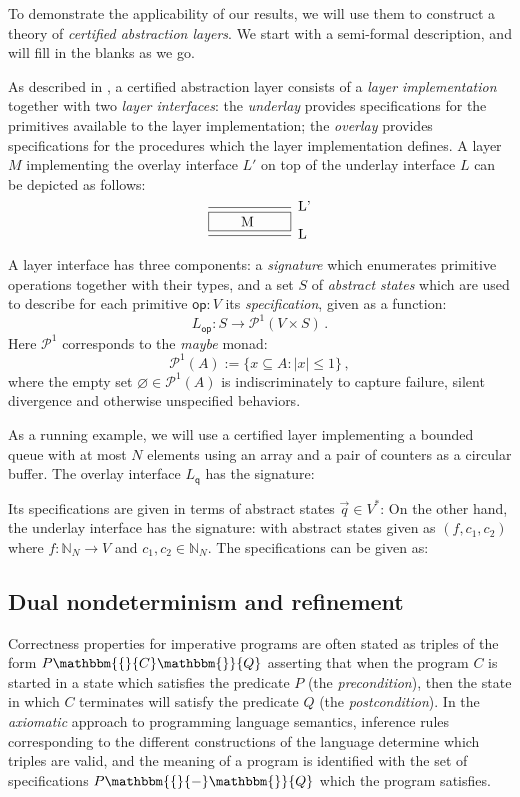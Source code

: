 \documentclass[format=sigplan,authordraft]{acmart}
\newcommand{\kw}[1]{\ensuremath{ \mathsf{#1} }}
\newcommand{\htr}[3]{{ {#1} \mathbbm{\{} {#2} \mathbbm{\}} {#3} }}
\begin{document}
To demonstrate the applicability of our results,
we will use them to construct a theory of
\emph{certified abstraction layers}.
We start with a semi-formal description,
and will fill in the blanks as we go.

As described in \cite{popl15},
a certified abstraction layer
consists of a \emph{layer implementation} together with
two \emph{layer interfaces}:
the \emph{underlay} provides specifications for
the primitives available to the layer implementation;
the \emph{overlay} provides specifications for
the procedures which the layer implementation defines.
A layer $M$ implementing the overlay interface $L'$
on top of the underlay interface $L$ can be depicted as follows:
\[
  \begin{prooftree}
    \infer0[L']{\fbox{\qquad M \qquad}}
    \infer1[L]{}
  \end{prooftree}
\]

A layer interface has three components:
a \emph{signature} which enumerates
primitive operations together with their types, and
a set $S$ of \emph{abstract states}
which are used to describe for each primitive
$\kw{op} : V$
its \emph{specification},
given as a function:
\[
  L_\kw{op} : S \rightarrow \mathcal{P}^1(V \times S) \,.
\]
Here $\mathcal{P}^1$ corresponds to the \emph{maybe} monad:
\[
  \mathcal{P}^1(A) := \{ x \subseteq A : |x| \le 1 \} \,,
\]
where the empty set $\varnothing \in \mathcal{P}^1(A)$
is indiscriminately to capture
failure, silent divergence and otherwise unspecified behaviors.

As a running example,
we will use a certified layer
implementing a bounded queue with at most $N$ elements
using an array and a pair of counters
as a circular buffer.
The overlay interface $L_\kw{q}$ has the signature:

Its specifications are given in terms of
abstract states $\vec{q} \in V^*$:
On the other hand,
the underlay interface
has the signature:
with abstract states given as $(f, c_1, c_2)$
where $f : \mathbb{N}_N \rightarrow V$ and
$c_1, c_2 \in \mathbb{N}_N$.
The specifications can be given as:

\subsection{Dual nondeterminism and refinement} \label{sec:refcal} %


Correctness properties for imperative programs
are often stated as triples of the form $\htr{P}{C}{Q}$
asserting that
when the program $C$ is started in a state which
satisfies the predicate $P$ (the \emph{precondition}),
then the state in which $C$ terminates
will satisfy the predicate $Q$ (the \emph{postcondition}).
In the \emph{axiomatic} approach to programming language semantics,
inference rules
corresponding to the different constructions of the language
determine which triples are valid,
and the meaning of a program is identified with
the set of specifications $\htr{P}{-}{Q}$
which the program satisfies.
\end{document}
